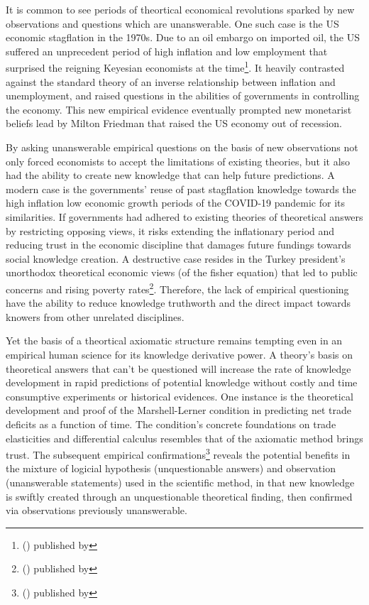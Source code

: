 \documentclass[a4paper,12pt]{article}
\newcommand{\citefoot}[1]{\footnote{\citeall{#1}}}
\newcommand{\citeall}[1]{\citeauth{#1} \citetitle{#1} (\citeyear{#1}) published by \citelist{#1}{publisher}}
\begin{document}
It is common to see periods of theortical economical revolutions sparked by new observations and questions which are unanswerable. One such case is the US economic stagflation in the 1970s. Due to an oil embargo on imported oil, the US suffered an unprecedent period of high inflation and low employment that surprised the reigning Keyesian economists at the time\citefoot{nielsen_2022}. It heavily contrasted against the standard theory of an inverse relationship between inflation and unemployment, and raised questions in the abilities of governments in controlling the economy. This new empirical evidence eventually prompted new monetarist beliefs lead by Milton Friedman that raised the US economy out of recession.

By asking unanswerable empirical questions on the basis of new observations not only forced economists to 
accept the limitations of existing theories, but it also had the ability to create new knowledge that can help future predictions. A modern case is the governments' reuse of past stagflation knowledge towards the high inflation low economic growth periods of the COVID-19 pandemic for its similarities. If governments had adhered to existing theories of theoretical answers by restricting opposing views, it risks extending the inflationary period and reducing trust in the economic discipline that damages future fundings towards social knowledge creation. A destructive case resides in the Turkey president's unorthodox theoretical economic views (of the fisher equation) that led to public concerns and rising poverty rates\citefoot{guardian_2022}. Therefore, the lack of empirical questioning have the ability to reduce knowledge truthworth and the direct impact towards knowers from other unrelated disciplines.

Yet the basis of a theortical axiomatic structure remains tempting even in an empirical human science for its knowledge derivative power. A theory's basis on theoretical answers that can't be questioned will increase the rate of knowledge development in rapid predictions of potential knowledge without costly and time consumptive experiments or historical evidences. One instance is the theoretical development and proof of the Marshell-Lerner condition in predicting net trade deficits as a function of time. The condition's concrete foundations on trade elasticities and differential calculus resembles that of the axiomatic method brings trust. The subsequent empirical confirmations\citefoot{hsing_2010} reveals the potential benefits in the mixture of logicial hypothesis (unquestionable answers) and observation (unanswerable statements) used in the scientific method, in that new knowledge is swiftly created through an unquestionable theoretical finding, then confirmed via observations previously unanswerable.
\end{document}
